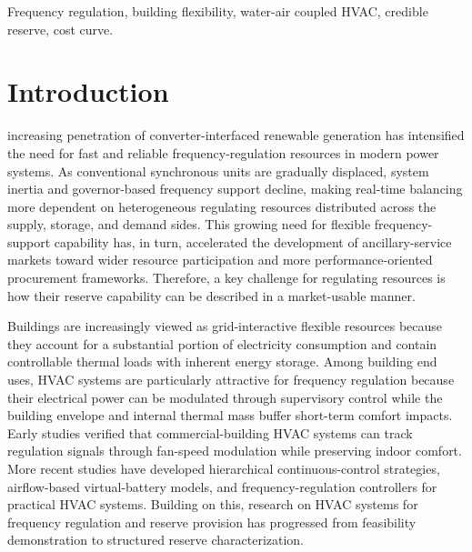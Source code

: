 \documentclass[journal]{IEEEtran}
\theoremstyle{remark}
\begin{document}
	\begin{IEEEkeywords}
		Frequency regulation, building flexibility, water-air coupled HVAC, credible reserve, cost curve.
	\end{IEEEkeywords}
	
	\section{Introduction}
	\label{sec:introduction}
	
	 increasing penetration of converter-interfaced renewable generation has intensified the need for fast and reliable frequency-regulation resources in modern power systems\cite{ratnam2020future}. As conventional synchronous units are gradually displaced, system inertia and governor-based frequency support decline, making real-time balancing more dependent on heterogeneous regulating resources distributed across the supply, storage, and demand sides\cite{anderson2021frequency,he2024analysis}. This growing need for flexible frequency-support capability has, in  turn, accelerated the development of ancillary-service markets toward  wider resource participation and more performance-oriented procurement  frameworks\cite{rancilio2022ancillary}. Therefore, a key challenge for regulating resources is how their reserve capability can be described in a market-usable manner\cite{koltsaklis2023assessing}.
	
	Buildings are increasingly viewed as grid-interactive flexible resources because they account for a substantial portion of electricity consumption and contain controllable thermal loads with inherent energy storage\cite{tang2021flexibility}. Among building end uses, HVAC systems are particularly attractive for frequency regulation because their electrical power can be modulated through supervisory control while the building envelope and internal thermal mass buffer short-term comfort impacts\cite{hwang2023demand,ding2024flexibility}. Early studies verified that commercial-building HVAC systems can track regulation signals through fan-speed modulation while preserving indoor comfort\cite{lin2015experimental,beil2016frequency}. More recent studies have developed hierarchical continuous-control strategies\cite{wang2021hierarchical}, airflow-based virtual-battery models\cite{wang2020operating}, and frequency-regulation controllers for practical HVAC systems\cite{zhou2024hybrid}. Building on this, research on HVAC systems for frequency regulation and reserve provision has progressed from feasibility demonstration to structured reserve characterization. 
	
\end{document}
